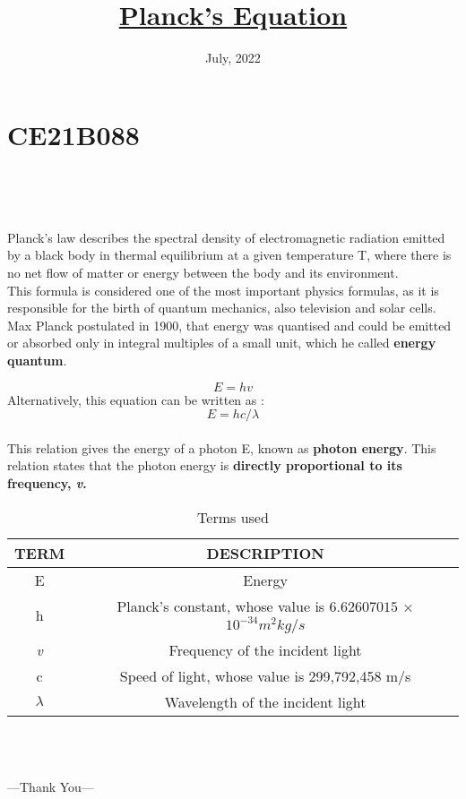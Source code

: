 \section{CE21B088}
\begin{center}
    \title{\textbf{\underline{{\huge Planck's Equation}}}}\\[\baselineskip]
    \date{July, 2022} \\[\baselineskip]
\end{center}
\maketitle


\textsf{{\large Planck's law describes the spectral density of electromagnetic radiation emitted by a black body in thermal equilibrium at a given temperature T, where there is no net flow of matter or energy between the body and its environment.}} \\[\baselineskip]
\textsf{{\large This formula is considered one of the most important physics formulas, as it is responsible for the birth of quantum mechanics, also television and solar cells.  Max Planck postulated in 1900, that energy was quantised and could be emitted or absorbed only in integral multiples of a small unit, which he called \textbf{energy quantum}.}}

{\LARGE \[\boxed{ E=hv }\]}
\textsf{\large Alternatively, this equation can be written as : }
{\LARGE \[\boxed{E=hc/\lambda}\]} \\
\textsf{\large This relation gives the energy of a photon E, known as \textbf{photon energy}. This relation states that the photon energy is \textbf{directly proportional to its frequency, \textit{v}.} }
\begin{table}[h!]
   \begin{center}
    \caption{Terms used}
        \begin{tabular}{| c | c |}
       
        \hline
            \textsf{\textbf{TERM}} & \textsf{\textbf{DESCRIPTION}}  \\\hline
            \textsf{E} & \textsf{Energy}  \\\hline
            \textsf{h} & \textsf{Planck's constant, whose value is $6.62607015$ × $10^{-34} m^2 kg / s$}  \\\hline
            \textsf{\textit{v}} & \textsf{Frequency of the incident light} \\ \hline
            \textsf{c} & \textsf{Speed of light, whose value is 299,792,458 m/s} \\ \hline
            $\lambda$ & \textsf{Wavelength of the incident light} \\ \hline
        \end{tabular}
    \end{center}
    \end{table}
    \\[2\baselineskip]
    \\[2\baselineskip]
    \begin{center}
        {\Large ---Thank You---}
    \end{center}

